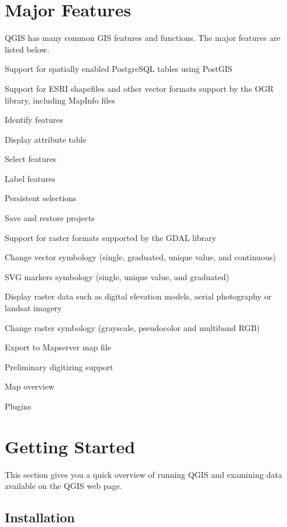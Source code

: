 \documentclass[10pt,english]{article}
\begin{document}
\begin{onehalfspace}
\begin{compactenum}
\end{compactenum}
\section{Major Features}

QGIS has many common GIS features and functions. The major features
are listed below. 

\begin{compactenum}
\item Support for spatially enabled PostgreSQL tables using PostGIS 
\item Support for ESRI shapefiles and other vector formats support by the
OGR library, including MapInfo files 
\item Identify features 
\item Display attribute table 
\item Select features 
\item Label features
\item Persistent selections 
\item Save and restore projects
\item Support for raster formats supported by the GDAL library 
\item Change vector symbology (single, graduated, unique value, and continuous) 
\item SVG markers symbology (single, unique value, and graduated) 
\item Display raster data such as digital elevation models, aerial photography
or landsat imagery 
\item Change raster symbology (grayscale, pseudocolor and multiband RGB) 
\item Export to Mapserver map file 
\item Preliminary digitizing support
\item Map overview
\item Plugins 
\end{compactenum}

\section{Getting Started}

This section gives you a quick overview of running QGIS and examining
data available on the QGIS web page.


\subsection{Installation}


\end{onehalfspace}
\end{document}
